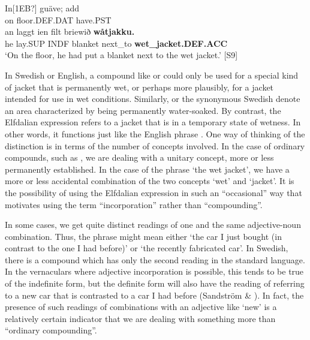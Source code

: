 
\ea\label{}
\gll In[1EB?]  guäve;  add\\
on  floor.DEF.DAT  have.PST\\
\gll an  laggt  ien  filt  briewið  \textbf{wåtjakku.}\\
he  lay.SUP  INDF  blanket  next\_to  \textbf{wet\_jacket.DEF.ACC}\\
\glt  ‘On the floor, he had put a blanket next to the wet jacket.’ [S9]
\z

In Swedish or English, a compound like  or  could only be used for a special kind of jacket that is permanently wet, or perhaps more plausibly, for a jacket intended for use in wet conditions. Similarly,  or the synonymous Swedish  denote an area characterized by being permanently water-soaked. By contrast, the Elfdalian expression refers to a jacket that is in a temporary state of wetness. In other words, it functions just like the English phrase . One way of thinking of the distinction is in terms of the number of concepts involved. In the case of ordinary compounds, such as , we are dealing with a unitary concept, more or less permanently established. In the case of the phrase ‘the wet jacket’, we have a more or less accidental combination of the two concepts ‘wet’ and ‘jacket’. It is the possibility of using the Elfdalian expression in such an “occasional” way that motivates using the term “incorporation” rather than “compounding”. 


In some cases, we get quite distinct readings of one and the same adjective-noun combination. Thus, the phrase  might mean either ‘the car I just bought (in contrast to the one I had before)’ or ‘the recently fabricated car’. In Swedish, there is a compound  which has only the second reading in the standard language. In the vernaculars where adjective incorporation is possible, this tends to be true of the indefinite form, but the definite form will also have the reading of referring to a new car that is contrasted to a car I had before (Sandström \& \citet[91]{Holmberg2003}). In fact, the presence of such readings of combinations with an adjective like ‘new’ is a relatively certain indicator that we are dealing with something more than “ordinary compounding”.

